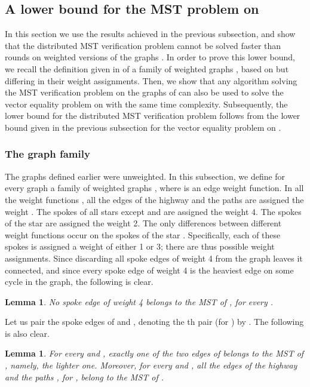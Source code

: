 \documentclass[11pt,letter]{article}
\newtheorem{lemma}[theorem]{Lemma}
\begin{document}
\subsection {A lower bound for the MST problem on }
\label{sec:lb_ver_prob}

In this section we use the results achieved in the previous subsection,
and show that 
the distributed MST verification
problem cannot be solved faster than  rounds on weighted
versions of the graphs .
In order to prove this lower bound, 
we recall the definition given in  
of a family of weighted graphs , based on  but differing 
in their weight assignments.
Then, 
we show that any algorithm solving 
the MST verification problem on the graphs of  can also be used to 
solve the vector equality problem on  with the same time complexity.
Subsequently, the lower bound for the distributed MST verification problem 
follows from 
the lower bound given in the previous subsection for the vector 
equality problem on .

\subsubsection{The graph family }
The graphs  defined earlier were unweighted.
In this subsection, we define for every graph  a family of
weighted graphs
,
where  is an edge weight function.
In all the weight functions , all the edges of the
highway  and the paths  are assigned the weight .
The spokes of all stars except  and  are assigned
the weight 4. The spokes of the star  are assigned the weight 2.
The only differences between different weight functions 
occur on the  spokes of the star .
Specifically, each of these  spokes is assigned a weight of
either 1 or 3; there are thus  possible 
weight assignments. 
\newline\indent
Since discarding all spoke edges of weight 4 from the
graph  leaves it connected, and since every spoke
edge of weight 4 is the heaviest edge on some cycle in the graph, the
following is clear.

\begin{lemma}
\label{infWE}
No spoke edge of weight 4 belongs to the MST of ,
for every .
\end{lemma}

Let us pair the spoke edges of  and , denoting the th
pair (for ) by
.
The following is also clear.
\begin{lemma}
\label{finWE}
For every  and , exactly
one of the two edges of 
belongs to the MST of , namely, the lighter one.
Moreover, for every  and ,
all the edges of the highway  and the paths ,
for , belong to the MST of .
\end{lemma}
\end{document}
